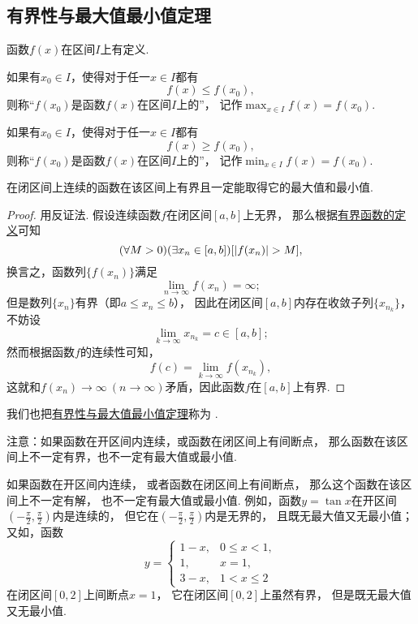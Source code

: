 \subsection{有界性与最大值最小值定理}
\begin{definition}
函数\(f(x)\)在区间\(I\)上有定义.

如果有\(x_0 \in I\)，使得对于任一\(x \in I\)都有\[
	f(x) \leq f(x_0),
\]
则称“\(f(x_0)\)是函数\(f(x)\)在区间\(I\)上的”，
记作\(\max_{x \in I}f(x) = f(x_0)\).

如果有\(x_0 \in I\)，使得对于任一\(x \in I\)都有\[
	f(x) \geq f(x_0),
\]
则称“\(f(x_0)\)是函数\(f(x)\)在区间\(I\)上的”，
记作\(\min_{x \in I}f(x) = f(x_0)\).
\end{definition}

\begin{theorem}[有界性与最大值最小值定理]\label{theorem:极限.最值定理}
在闭区间上连续的函数在该区间上有界且一定能取得它的最大值和最小值.
\begin{proof}
用反证法.
假设连续函数\(f\)在闭区间\([a,b]\)上无界，
那么根据\hyperref[definition:函数.函数的有界性]{有界函数的定义}可知\[
	(\forall M>0)
	(\exists x_n\in[a,b])
	[\abs{f(x_n)} > M],
\]
换言之，函数列\(\{f(x_n)\}\)满足\[
	\lim\limits_{n\to\infty} f(x_n) = \infty;
\]
但是数列\(\{x_n\}\)有界（即\(a \leq x_n \leq b\)），
因此在闭区间\([a,b]\)内存在收敛子列\(\{x_{n_k}\}\)，
不妨设\[
	\lim\limits_{k\to\infty} x_{n_k} = c \in [a,b];
\]
然而根据函数\(f\)的连续性可知，\[
	f(c) = \lim\limits_{k\to\infty} f(x_{n_k}),
\]
这就和\(f(x_n)\to\infty\ (n\to\infty)\)矛盾，因此函数\(f\)在\([a,b]\)上有界.
\end{proof}
\end{theorem}
我们也把\hyperref[theorem:极限.最值定理]{有界性与最大值最小值定理}称为%
.

注意：如果函数在开区间内连续，或函数在闭区间上有间断点，
那么函数在该区间上不一定有界，也不一定有最大值或最小值.

如果函数在开区间内连续，
或者函数在闭区间上有间断点，
那么这个函数在该区间上不一定有解，
也不一定有最大值或最小值.
例如，函数\(y=\tan x\)在开区间\(\left(-\frac{\pi}{2},\frac{\pi}{2}\right)\)内是连续的，
但它在\(\left(-\frac{\pi}{2},\frac{\pi}{2}\right)\)内是无界的，
且既无最大值又无最小值；
又如，函数\[
	y=\left\{ \begin{array}{ll}
		1-x, & 0\leq x<1, \\
		1, & x=1, \\
		3-x, & 1<x\leq2
	\end{array} \right.
\]在闭区间\([0,2]\)上间断点\(x=1\)，
它在闭区间\([0,2]\)上虽然有界，
但是既无最大值又无最小值.

